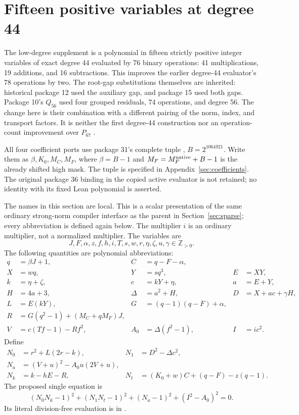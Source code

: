 \section{Fifteen positive variables at degree 44}
\label{sec:offset44}

The low-degree supplement is a polynomial in fifteen strictly positive
integer variables of exact degree 44 evaluated by 76 binary operations:
41 multiplications, 19 additions, and 16 subtractions. This improves the
earlier degree-44 evaluator's 78 operations by two. The root-gap
substitutions themselves are inherited: historical package 12 used the
auxiliary gap, and package 15 used both gaps. Package 10's $Q_{56}$ used
four grouped residuals, 74 operations, and degree 56. The change here is
their combination with a different pairing of the norm, index, and
transport factors. It is neither the first degree-44 construction nor an
operation-count improvement over $P_{67}$ \cite{historical,active}.

All four coefficient ports use package 31's complete tuple \cite{package31},
$B=2^{1064921}$. Write them as $\beta,K_0,M_C,M_F$, where $\beta=B-1$
and $M_F=M_F^{\rm native}+B-1$ is the already shifted high mask.
The tuple is specified in Appendix~\ref{sec:coefficients}. The original package 36
binding in the copied active evaluator is not retained; no identity with
its fixed Lean polynomial is asserted.

The names in this section are local. This is a scalar presentation of the
same ordinary strong-norm compiler interface as the parent in
Section~\ref{sec:sparse}; every abbreviation is defined again below.
The multiplier $i$ is an ordinary multiplier, not a normalized multiplier.
The variables are
\[
 J,F,\alpha,z,f,h,i,T,s,w,r,\eta,\zeta,u,\gamma
 \in\mathbb Z_{>0}.
\]
The following quantities are polynomial abbreviations:
\begin{align*}
q&=\beta J+1,& C&=q-F-\alpha,\\
X&=wq,&Y&=sq^3,&E&=XY,\\
k&=\eta+\zeta,&c&=kY+\eta,&a&=E+Y,\\
H&=4a+3,&\Delta&=a^2+H,&D&=X+ac+\gamma H,\\
L&=E(kY),&G&=(q-1)(q-F)+\alpha,\\
R&=G(q^2-1)+(M_C+qM_F)J,&&\\
V&=c(Tf-1)-Rf^2,&A_0&=\Delta(f^2-1),&I&=ic^2.
\end{align*}
Define
\begin{align*}
N_0&=r^2+L(2r-k),&N_1&=D^2-\Delta c^2,\\
N_a&=(V+u)^2-A_0u(2V+u),&&\\
N_k&=k-hE-R,&N_t&=(K_0+w)C+(q-F)-z(q-1).
\end{align*}
The proposed single equation is
\begin{equation}\label{eq:offset44}
\boxed{(N_0N_k-1)^2+(N_1N_t-1)^2+(N_a-1)^2+(I^2-A_0)^2=0.}
\end{equation}
Its literal division-free evaluation is in .

